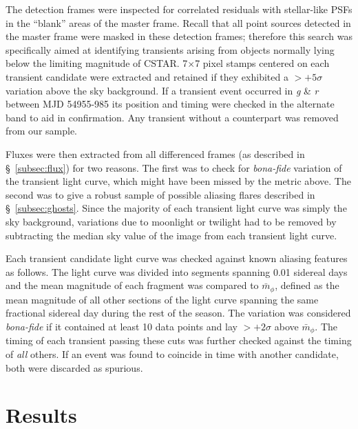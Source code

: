 The detection frames were inspected for correlated residuals with stellar-like PSFs in the ``blank'' areas of the master frame. Recall that all point sources detected in the master frame were masked in these detection frames; therefore this search was specifically aimed at identifying transients arising from objects normally lying below the limiting magnitude of CSTAR. 7$\times$7 pixel stamps centered on each transient candidate were extracted and retained if they exhibited a $>+5\sigma$ variation above the sky background. If a transient event occurred in \textit{g} \& \textit{r} between MJD 54955-985 its position and timing were checked in the alternate band to aid in confirmation. Any transient without a counterpart was removed from our sample.

Fluxes were then extracted from all differenced frames (as described in \S~\ref{subsec:flux}) for two reasons. The first was to check for \textit{bona-fide} variation of the transient light curve, which might have been missed by the metric above. The second was to give a robust sample of possible aliasing flares described in \S~\ref{subsec:ghosts}. Since the majority of each transient light curve was simply the sky background, variations due to moonlight or twilight had to be removed by subtracting the median sky value of the image from each transient light curve. 

Each transient candidate light curve was checked against known aliasing features as follows. The light curve was divided into segments spanning 0.01 sidereal days and the mean magnitude of each fragment was compared to $\bar{m}_\phi$, defined as the mean magnitude of all other sections of the light curve spanning the same fractional sidereal day during the rest of the season.  The variation was considered \textit{bona-fide} if it contained at least 10 data points and lay $>+2\sigma$ above $\bar{m}_\phi$. The timing of each transient passing these cuts was further checked against the timing of \textit{all} others. If an event was found to coincide in time with another candidate, both were discarded as spurious.

\section{Results}

